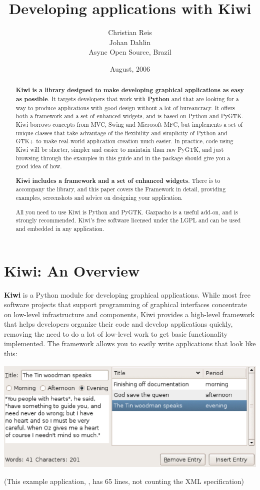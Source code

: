\documentclass[a4paper]{howto}
\title{Developing applications with Kiwi}
\author{Christian Reis\\Johan Dahlin\\Async Open Source, Brazil}
\date{August, 2006}
\begin{document}
\maketitle

\begin{abstract}
\noindent
{\bf Kiwi is a library designed to make developing graphical
applications as easy as possible}. It targets developers that work with
{\bf Python} and that are looking for a way to produce applications with
good design without a lot of bureaucracy.  It offers both a framework
and a set of enhanced widgets, and is based on Python and PyGTK. Kiwi
borrows concepts from MVC, Swing and Microsoft MFC, but implements a set
of unique classes that take advantage of the flexibility and simplicity
of Python and GTK+ to make real-world application creation much easier.
In practice, code using Kiwi will be shorter, simpler and easier to
maintain than raw PyGTK, and just browsing through the examples in this
guide and in the package should give you a good idea of how.

{\bf Kiwi includes a framework and a set of enhanced widgets}. There is
 to accompany the library, and this paper covers the
Framework in detail, providing examples, screenshots and advice on
designing your application.

All you need to use Kiwi is Python and PyGTK. Gazpacho is a useful add-on,
and is strongly recommended. Kiwi's free software licensed under the LGPL
and can be used and embedded in any application.
\end{abstract}

\section{Kiwi: An Overview}

\textbf{Kiwi} is a Python module for developing graphical applications.
While most free software projects that support programming of graphical
interfaces concentrate on low-level infrastructure and components, Kiwi
provides a high-level framework that helps developers organize their
code and develop applications quickly, removing the need to do a lot of
low-level work to get basic functionality implemented. The framework
allows you to easily write applications that look like this:

\begin{center}
\includegraphics[scale=0.626]{images/diary.eps}

\small{(This example application, , has
65 lines, not counting the XML specification)}
\end{center}
\end{document}

